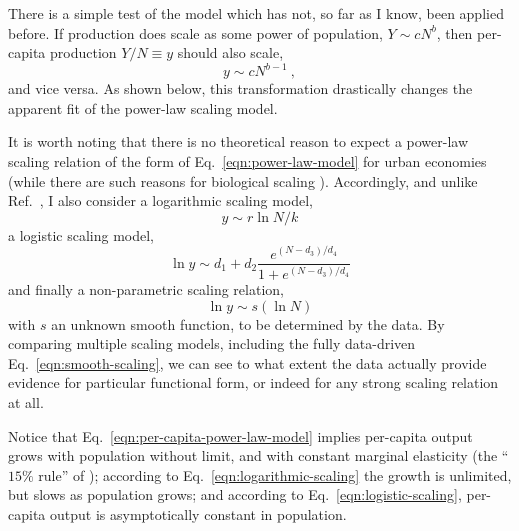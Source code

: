 \documentclass{pnastwo}
\begin{document}
\begin{article}
There is a simple test of the model which has not, so far as I know, been
applied before.  If production does scale as some power of population, $Y \sim
cN^b$, then per-capita production $Y/N \equiv y$ should also scale,
\begin{equation}
 y \sim c N^{b-1} ~,
\label{eqn:per-capita-power-law-model}
\end{equation}
and vice versa.  As shown below, this transformation drastically changes the
apparent fit of the power-law scaling model.

It is worth noting that there is no theoretical reason to expect a power-law
scaling relation of the form of Eq.\ \ref{eqn:power-law-model} for urban
economies (while there are such reasons for biological scaling
\citep{West-Brown-Enquist-origin-of-scaling,Brown-West-scaling-in-bio}).
Accordingly, and unlike Ref.\
\cite{Bettencout-et-al-growth-innovation-scaling}, I also consider a
logarithmic scaling model,
\begin{equation}
y \sim r \ln{N/k}
\label{eqn:logarithmic-scaling}
\end{equation}
a logistic scaling model,
\begin{equation}
\ln{y} \sim d_1 + d_2 \frac{e^{(N-d_3)/d_4}}{1+e^{(N - d_3)/d_4}}
\label{eqn:logistic-scaling}
\end{equation}
and finally a non-parametric scaling relation,
\begin{equation}
\ln{y} \sim s(\ln{N})
\label{eqn:smooth-scaling}
\end{equation}
with $s$ an unknown smooth function, to be determined by the data.  By
comparing multiple scaling models, including the fully data-driven Eq.\
\ref{eqn:smooth-scaling}, we can see to what extent the data actually provide
evidence for particular functional form, or indeed for any strong scaling
relation at all.

Notice that Eq.\ \ref{eqn:per-capita-power-law-model} implies per-capita output
grows with population without limit, and with constant marginal elasticity (the
``$15\%$ rule'' of \cite{Bettencourt-West-unified-theory-of-urban-living});
according to Eq.\ \ref{eqn:logarithmic-scaling} the growth is unlimited, but
slows as population grows; and according to Eq.\ \ref{eqn:logistic-scaling},
per-capita output is asymptotically constant in population.



\end{article}
\end{document}
